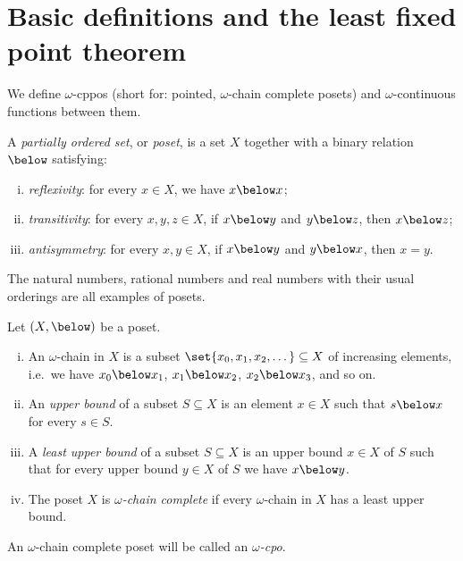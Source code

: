 \section{Basic definitions and the least fixed point theorem}

We define \(\omega\)-cppos (short for: pointed,
\(\omega\)-chain complete posets) and \(\omega\)\nobreakdash-continuous
functions between them.

\begin{definition}[Poset]
  A \emph{partially ordered set}, or \emph{poset}, is a set \(X\) together with
  a binary relation \({\below}\) satisfying:
  \begin{enumerate}[(i)]
  \item \emph{reflexivity}: for every \(x \in X\), we have \(x \below x\);
  \item \emph{transitivity}: for every \(x,y,z \in X\), if \(x \below y\) and
    \(y \below z\), then \(x \below z\);
  \item \emph{antisymmetry}: for every \(x,y \in X\), if \(x \below y\) and
    \(y \below x\), then \(x = y\). \qedhere
  \end{enumerate}
\end{definition}

\begin{example}
  The natural numbers, rational numbers and real numbers with their usual
  orderings are all examples of posets.
\end{example}

\begin{definition}
  Let \((X,{\below})\) be a poset.
  \begin{enumerate}[(i)]
  \item An \(\omega\)-chain in \(X\) is a subset
    \(\set{x_0,x_1,x_2,\dots} \subseteq X\) of increasing elements, i.e.\ we
    have \(x_0 \below x_1\), \(x_1 \below x_2\), \(x_2 \below x_3\), and so
    on.%
  \item An \emph{upper bound} of a subset \(S \subseteq X\) is an element
    \(x \in X\) such that \(s \below x\) for every \(s \in S\).
  \item A \emph{least upper bound} of a subset \(S \subseteq X\) is an upper
    bound \(x \in X\) of \(S\) such that for every upper bound \(y \in X\) of
    \(S\) we have \(x \below y\).
  \item The poset \(X\) is \emph{\(\omega\)-chain complete} if every
    \(\omega\)-chain in \(X\) has a least upper bound.%
  \end{enumerate}
  An \(\omega\)-chain complete poset will be called an \emph{\(\omega\)-cpo}.
\end{definition}

